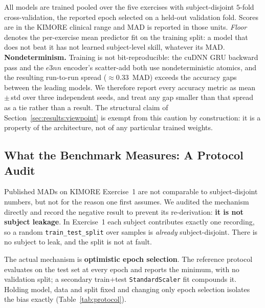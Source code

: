 All models are trained pooled over the five exercises with subject-disjoint $5$-fold
cross-validation, the reported epoch selected on a held-out validation fold. Scores are in the
KIMORE clinical range and MAD is reported in those units. \emph{Floor} denotes the per-exercise
mean predictor fit on the training split: a model that does not beat it has not learned
subject-level skill, whatever its MAD. \textbf{Nondeterminism.} Training is not bit-reproducible:
the cuDNN GRU backward pass and the $e3nn$ encoder's scatter-add both use nondeterministic atomics,
and the resulting run-to-run spread ($\approx\!0.33$~MAD) exceeds the accuracy gaps between the
leading models. We therefore report every accuracy metric as mean\,$\pm$\,std over three independent
seeds, and treat any gap smaller than that spread as a tie rather than a result. The structural
claim of Section~\ref{sec:results:viewpoint} is exempt from this caution by construction: it is a
property of the architecture, not of any particular trained weights.

\subsection{What the Benchmark Measures: A Protocol Audit}
\label{sec:results:protocol}

Published MADs on KIMORE Exercise~1 are not comparable to subject-disjoint numbers, but not for
the reason one first assumes. We audited the mechanism directly and record the negative result to
prevent its re-derivation: \textbf{it is not subject leakage}. In Exercise~1 each subject
contributes exactly one recording, so a random \texttt{train\_test\_split} over samples is
\emph{already} subject-disjoint. There is no subject to leak, and the split is not at fault.

The actual mechanism is \textbf{optimistic epoch selection}. The reference protocol evaluates on
the test set at every epoch and reports the minimum, with no validation split; a secondary
train$+$test \texttt{StandardScaler} fit compounds it. Holding model, data and split fixed and
changing only epoch selection isolates the bias exactly (Table~\ref{tab:protocol}).

